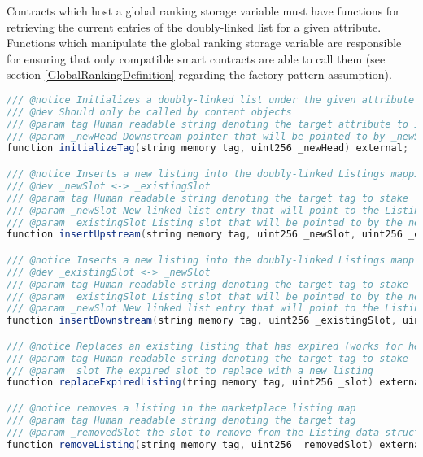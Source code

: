 Contracts which host a global ranking storage variable must have functions for retrieving the current entries of the doubly-linked list for a given attribute. Functions which manipulate the global ranking storage variable are responsible for ensuring that only compatible smart contracts are able to call them (see section \ref{GlobalRankingDefinition} regarding the factory pattern assumption).

\begin{lstlisting}[language=Java, caption=a minimal interface for reading and writing to the global ranking namespace]
/// @notice Initializes a doubly-linked list under the given attribute
/// @dev Should only be called by content objects
/// @param tag Human readable string denoting the target attribute to insert into global ranking
/// @param _newHead Downstream pointer that will be pointed to by _newSlot
function initializeTag(string memory tag, uint256 _newHead) external;

/// @notice Inserts a new listing into the doubly-linked Listings mapping
/// @dev _newSlot <-> _existingSlot 
/// @param tag Human readable string denoting the target tag to stake
/// @param _newSlot New linked list entry that will point to the Listing at _existingSlot 
/// @param _existingSlot Listing slot that will be pointed to by the new Listing at _newSlot 
function insertUpstream(string memory tag, uint256 _newSlot, uint256 _existingSlot) external;

/// @notice Inserts a new listing into the doubly-linked Listings mapping
/// @dev _existingSlot <-> _newSlot
/// @param tag Human readable string denoting the target tag to stake
/// @param _existingSlot Listing slot that will be pointed to by the new Listing at _newSlot  
/// @param _newSlot New linked list entry that will point to the Listing at _existingSlot 
function insertDownstream(string memory tag, uint256 _existingSlot, uint256 _newSlot) external;

/// @notice Replaces an existing listing that has expired (works for head and tail listings)
/// @param tag Human readable string denoting the target tag to stake
/// @param _slot The expired slot to replace with a new listing
function replaceExpiredListing(tring memory tag, uint256 _slot) external;

/// @notice removes a listing in the marketplace listing map
/// @param tag Human readable string denoting the target tag
/// @param _removedSlot the slot to remove from the Listing data structure
function removeListing(string memory tag, uint256 _removedSlot) external;


\end{lstlisting}
